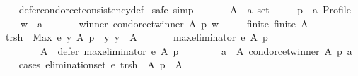 \begin{isabellebody}
%
\isadelimproof
\ \ %
\endisadelimproof
%
\isatagproof
{}\isamarkupfalse%
\ defer{\isacharunderscore}{\kern0pt}condorcet{\isacharunderscore}{\kern0pt}consistency{\isacharunderscore}{\kern0pt}def\isanewline
{}\isamarkupfalse%
\ {\isacharparenleft}{\kern0pt}safe{\isacharcomma}{\kern0pt}\ simp{\isacharparenright}{\kern0pt}\isanewline
\ \ \isamarkupfalse%
\isanewline
\ \ \ \ A\ {\isacharcolon}{\kern0pt}{\isacharcolon}{\kern0pt}\ {\isachardoublequoteopen}{\isacharprime}{\kern0pt}a\ set{\isachardoublequoteclose}\ \isanewline
\ \ \ \ p\ {\isacharcolon}{\kern0pt}{\isacharcolon}{\kern0pt}\ {\isachardoublequoteopen}{\isacharprime}{\kern0pt}a\ Profile{\isachardoublequoteclose}\ \isanewline
\ \ \ \ w\ {\isacharcolon}{\kern0pt}{\isacharcolon}{\kern0pt}\ {\isachardoublequoteopen}{\isacharprime}{\kern0pt}a{\isachardoublequoteclose}\isanewline
\ \ \isamarkupfalse%
\isanewline
\ \ \ \ winner{\isacharcolon}{\kern0pt}\ {\isachardoublequoteopen}condorcet{\isacharunderscore}{\kern0pt}winner\ A\ p\ w{\isachardoublequoteclose}\ \isanewline
\ \ \ \ finite{\isacharcolon}{\kern0pt}\ {\isachardoublequoteopen}finite\ A{\isachardoublequoteclose}\isanewline
\ \ \isamarkupfalse%
\ {\isacharquery}{\kern0pt}trsh\ {\isacharequal}{\kern0pt}\ {\isachardoublequoteopen}{\isacharparenleft}{\kern0pt}Max\ {\isacharbraceleft}{\kern0pt}e\ y\ A\ p\ {\isacharbar}{\kern0pt}\ y{\isachardot}{\kern0pt}\ y\ {\isasymin}\ A{\isacharbraceright}{\kern0pt}{\isacharparenright}{\kern0pt}{\isachardoublequoteclose}\isanewline
\ \ \isamarkupfalse%
\isanewline
\ \ \ \ {\isachardoublequoteopen}max{\isacharunderscore}{\kern0pt}eliminator\ e\ A\ p\ {\isacharequal}{\kern0pt}\isanewline
\ \ \ \ \ \ {\isacharparenleft}{\kern0pt}{\isacharbraceleft}{\kern0pt}{\isacharbraceright}{\kern0pt}{\isacharcomma}{\kern0pt}\isanewline
\ \ \ \ \ \ \ \ A\ {\isacharminus}{\kern0pt}\ defer\ {\isacharparenleft}{\kern0pt}max{\isacharunderscore}{\kern0pt}eliminator\ e{\isacharparenright}{\kern0pt}\ A\ p{\isacharcomma}{\kern0pt}\isanewline
\ \ \ \ \ \ \ \ {\isacharbraceleft}{\kern0pt}a\ {\isasymin}\ A{\isachardot}{\kern0pt}\ condorcet{\isacharunderscore}{\kern0pt}winner\ A\ p\ a{\isacharbraceright}{\kern0pt}{\isacharparenright}{\kern0pt}{\isachardoublequoteclose}\isanewline
\ \ \isamarkupfalse%
\ {\isacharparenleft}{\kern0pt}cases\ {\isachardoublequoteopen}elimination{\isacharunderscore}{\kern0pt}set\ e\ {\isacharparenleft}{\kern0pt}{\isacharquery}{\kern0pt}trsh{\isacharparenright}{\kern0pt}\ {\isacharparenleft}{\kern0pt}{\isacharless}{\kern0pt}{\isacharparenright}{\kern0pt}\ A\ p\ {\isasymnoteq}\ A{\isachardoublequoteclose}{\isacharparenright}{\kern0pt}\isanewline

\end{isabellebody}
